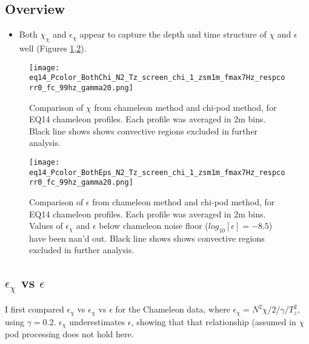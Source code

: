 \documentclass[11pt]{article}
\begin{document}
\subsection{Overview}


\begin{itemize}

\item Both $\chi_{\chi}$ and $\epsilon_{\chi}$ appear to capture the depth and time structure of $\chi$ and $\epsilon$ well (Figures \ref{chi_overview},\ref{eps_overview}).

\end{itemize}


\begin{figure}[htbp]
\texttt{[image: eq14\_Pcolor\_BothChi\_N2\_Tz\_screen\_chi\_1\_zsm1m\_fmax7Hz\_respcorr0\_fc\_99hz\_gamma20.png]}
\caption{Comparison of $\chi$ from chameleon method and chi-pod method, for EQ14 chameleon profiles. Each profile was averaged in 2m bins.  Black line shows shows convective regions excluded in further analysis.}
\label{chi_overview}
\end{figure}


\begin{figure}[htbp]
\texttt{[image: eq14\_Pcolor\_BothEps\_N2\_Tz\_screen\_chi\_1\_zsm1m\_fmax7Hz\_respcorr0\_fc\_99hz\_gamma20.png]}
\caption{Comparison of $\epsilon$ from chameleon method and chi-pod method, for EQ14 chameleon profiles. Each profile was averaged in 2m bins.  Values of $\epsilon_{\chi}$ and $\epsilon$ below chameleon noise floor ($log_{10}[\epsilon]=-8.5$) have been nan'd out. Black line shows shows convective regions excluded in further analysis.}
\label{eps_overview}
\end{figure}






\clearpage
\subsection{$\epsilon_{\chi}$ vs $\epsilon$}

I first compared $\epsilon_{\chi}$ vs $\epsilon_{\chi}$ vs $\epsilon$ for the Chameleon data, where $\epsilon_{\chi}=N^2\chi/2/\gamma/T_{z}^{2}$, using $\gamma=0.2$. $\epsilon_{\chi}$ underestimates $\epsilon$, showing that that relationship (assumed in $\chi$pod processing does not hold here.
\end{document}
